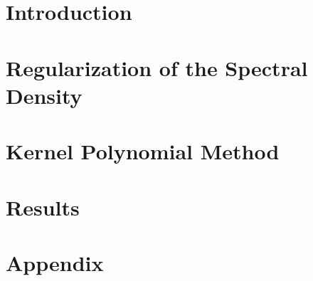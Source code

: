 \documentclass[11pt, a4paper]{report}
\theoremstyle{mydefinition}
\newcommand{\1}{\mathds{1}}
\begin{document}




\tableofcontents

\chapter{Introduction}


\chapter{Regularization of the Spectral Density}


\chapter{Kernel Polynomial Method}


\chapter{Results}


\chapter{Appendix}



\end{document}
